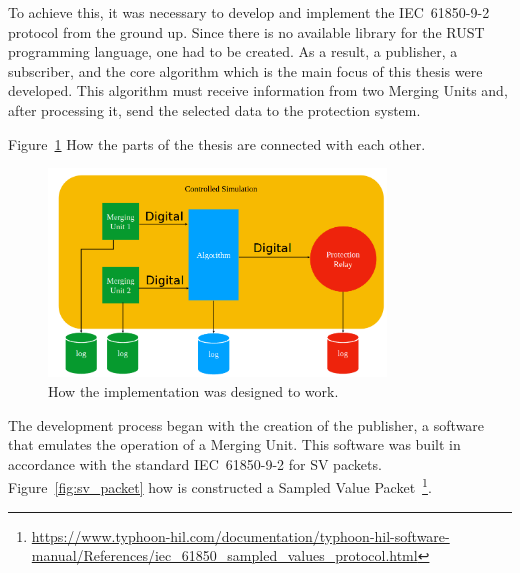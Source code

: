 To achieve this, it was necessary to develop and implement the IEC~61850-9-2 protocol from the ground up. Since there is no available library for the RUST programming language, one had to be created. As a result, a publisher, a subscriber, and the core algorithm which is the main focus of this thesis were developed. This algorithm must receive information from two Merging Units and, after processing it, send the selected data to the protection system.

Figure~\ref{fig:overview_of_implementation} How the parts of the thesis 
are connected with each other.

\begin{figure}[tbh]
	\centering
	\includegraphics[width=0.80\textwidth, keepaspectratio]{ch4/assets/Implementation.png} %
	\caption{How the implementation was designed to work.}
	\label{fig:overview_of_implementation}
\end{figure}
\FloatBarrier

The development process began with the creation of the publisher, a software that emulates the operation of a Merging Unit. This software was built in accordance with the standard IEC~61850-9-2 for SV packets. Figure~\ref{fig:sv_packet} how is constructed a Sampled Value Packet~\footnote{\url{https://www.typhoon-hil.com/documentation/typhoon-hil-software-manual/References/iec_61850_sampled_values_protocol.html}}.

